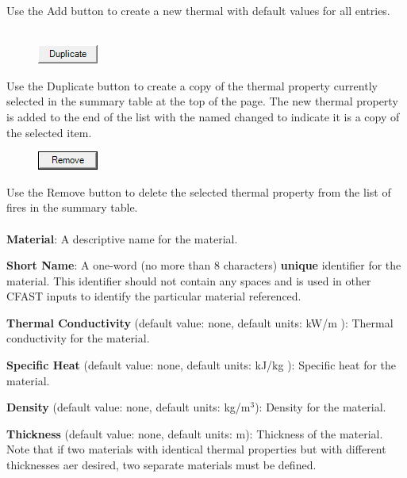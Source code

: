 Use the Add button to create a new thermal with default values for all entries. \\~ \\

\begin{figure}
  \includegraphics[width=0.781in]{FIGURES/Input_File/Duplicate_Button}
\end{figure}

Use the Duplicate button to create a copy of the thermal property currently selected in the summary table at the top of the page. The new thermal property is added to the end of the list with the named changed to indicate it is a copy of the selected item. \\

\begin{figure}
  \includegraphics[width=0.781in]{FIGURES/Input_File/Remove_Button}
\end{figure}

Use the Remove button to delete the selected thermal property from the list of fires in the summary table. \\~ \\

\textbf{Material}: A descriptive name for the material.

\textbf{Short Name}: A one-word (no more than 8 characters) \textbf{unique} identifier for the material.  This identifier should not contain any spaces and is used in other CFAST inputs to identify the particular material referenced.

\textbf{Thermal Conductivity} (default value: none, default units: kW/m \degc): Thermal conductivity for the material.

\textbf{Specific Heat} (default value: none, default units: kJ/kg \degc): Specific heat for the material.

\textbf{Density} (default value: none, default units: kg/m$^3$): Density for the material.

\textbf{Thickness} (default value: none, default units: m): Thickness of the material.  Note that if two materials with identical thermal properties but with different thicknesses aer desired, two separate materials must be defined.

